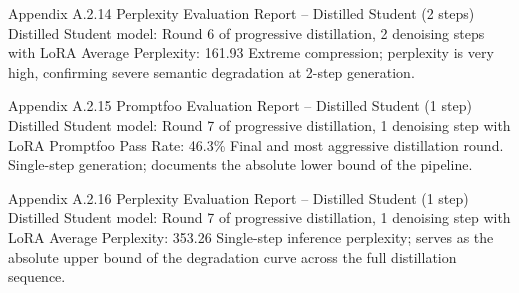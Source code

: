 \documentclass[11pt, a4paper]{article}
\begin{document}
\annexcover%
    {Appendix A.2.14}%
    {Perplexity Evaluation Report – Distilled Student (2 steps)}%
    {Distilled Student model: Round 6 of progressive distillation, 2 denoising steps with LoRA}%
    {Average Perplexity: 161.93}%
    {Extreme compression; perplexity is very high, confirming severe semantic degradation at 2-step generation.}

\annexcover%
    {Appendix A.2.15}%
    {Promptfoo Evaluation Report – Distilled Student (1 step)}%
    {Distilled Student model: Round 7 of progressive distillation, 1 denoising step with LoRA}%
    {Promptfoo Pass Rate: 46.3\%}%
    {Final and most aggressive distillation round. Single-step generation; documents the absolute lower bound of the pipeline.}

\annexcover%
    {Appendix A.2.16}%
    {Perplexity Evaluation Report – Distilled Student (1 step)}%
    {Distilled Student model: Round 7 of progressive distillation, 1 denoising step with LoRA}%
    {Average Perplexity: 353.26}%
    {Single-step inference perplexity; serves as the absolute upper bound of the degradation curve across the full distillation sequence.}
\end{document}
